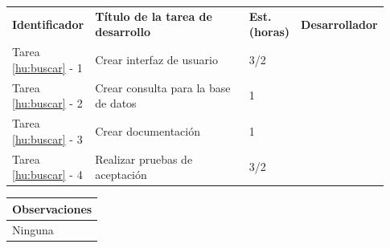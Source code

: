 \documentclass[11pt]{article}
\begin{document}
\vspace{-0.8cm}
\begin{longtable}{p{0.18\linewidth}|p{0.48\linewidth}|p{0.1\linewidth}|p{0.17\linewidth}}
  \toprule
  \textbf{Identificador} & \textbf{Título de la tarea de desarrollo} & \textbf{Est. (horas)} & \textbf{Desarrollador} \\
  Tarea \ref{hu:buscar} - 1 & Crear interfaz de usuario & 3/2 &\\
  Tarea \ref{hu:buscar} - 2 & Crear consulta para la base de datos & 1 & \\
  Tarea \ref{hu:buscar} - 3 & Crear documentación & 1 & \\
  Tarea \ref{hu:buscar} - 4 & Realizar pruebas de aceptación & 3/2 &  \\
  \bottomrule
\end{longtable}
\vspace{-0.8cm}
\begin{longtable}{p{1.028\linewidth}}
  \textbf{Observaciones}\\
  \midrule
  Ninguna\\
  \bottomrule
\end{longtable}
\end{document}
